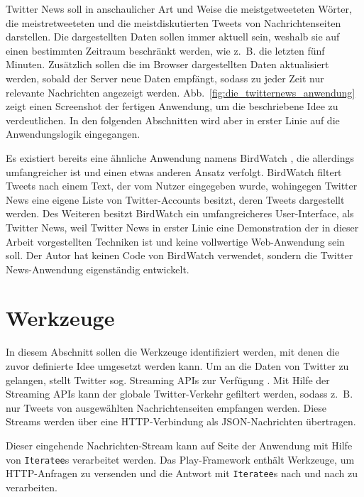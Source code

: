 Twitter News soll in anschaulicher Art und Weise die meistgetweeteten Wörter, die meistretweeteten und die meistdiskutierten Tweets von Nachrichtenseiten darstellen.
Die dargestellten Daten sollen immer aktuell sein, weshalb sie auf einen bestimmten Zeitraum beschränkt werden, wie z.~B. die letzten fünf Minuten.
Zusätzlich sollen die im Browser dargestellten Daten aktualisiert werden, sobald der Server neue Daten empfängt, sodass zu jeder Zeit nur relevante Nachrichten angezeigt werden.
Abb.~\ref{fig:die_twitternews_anwendung} zeigt einen Screenshot der fertigen Anwendung, um die beschriebene Idee zu verdeutlichen.
In den folgenden Abschnitten wird aber in erster Linie auf die Anwendungslogik eingegangen.

Es existiert bereits eine ähnliche Anwendung namens BirdWatch \cite[vgl.][]{bird_watch}, die allerdings umfangreicher ist und einen etwas anderen Ansatz verfolgt.
BirdWatch filtert Tweets nach einem Text, der vom Nutzer eingegeben wurde, wohingegen Twitter News eine eigene Liste von Twitter-Accounts besitzt, deren Tweets dargestellt werden.
Des Weiteren besitzt BirdWatch ein umfangreicheres User-Interface, als Twitter News, weil Twitter News in erster Linie eine Demonstration der in dieser Arbeit vorgestellten Techniken ist und keine vollwertige Web-Anwendung sein soll.
Der Autor hat keinen Code von BirdWatch verwendet, sondern die Twitter News-Anwendung eigenständig entwickelt.


\section{Werkzeuge} %
\label{sec:werkzeuge}

In diesem Abschnitt sollen die Werkzeuge identifiziert werden, mit denen die zuvor definierte Idee umgesetzt werden kann.
Um an die Daten von Twitter zu gelangen, stellt Twitter sog. Streaming APIs zur Verfügung \cite[vgl.][]{twitter_streaming_apis}.
Mit Hilfe der Streaming APIs kann der globale Twitter-Verkehr gefiltert werden, sodass z.~B. nur Tweets von ausgewählten Nachrichtenseiten empfangen werden.
Diese Streams werden über eine HTTP-Verbindung als JSON-Nachrichten übertragen.

Dieser eingehende Nachrichten-Stream kann auf Seite der Anwendung mit Hilfe von \lstinline|Iteratee|s verarbeitet werden.
Das Play-Framework enthält Werkzeuge, um HTTP-Anfragen zu versenden und die Antwort mit \lstinline|Iteratee|s nach und nach zu verarbeiten.

